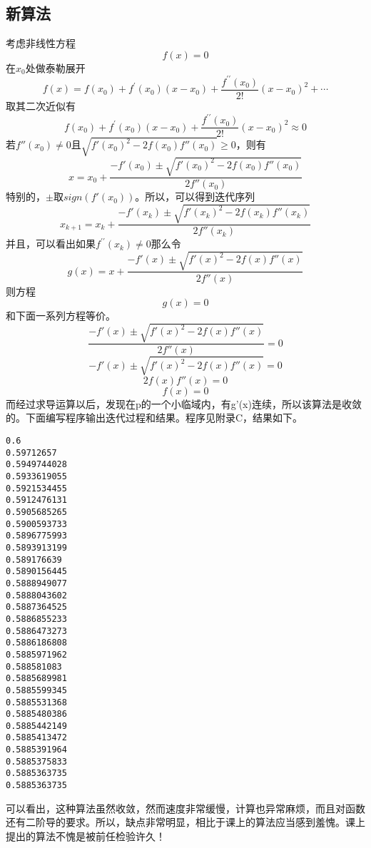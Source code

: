\documentclass[a4paper,11pt,onecolumn,twoside]{article}
\begin{document}
\subsection{新算法}
考虑非线性方程$$f(x)=0$$在$x_{0}$处做泰勒展开$$f ( x ) = f \left( x _ { 0 } \right) + f ^ { \prime } \left( x _ { 0 } \right) \left( x - x _ { 0 } \right) + \frac { f ^ { \prime \prime } \left( x _ { 0 } \right) } { 2 ! } \left( x - x _ { 0 } \right) ^ { 2 } + \cdots$$取其二次近似有
$$f \left( x _ { 0 } \right) + f ^ { \prime } \left( x _ { 0 } \right) \left( x - x _ { 0 } \right) + \frac { f ^ { \prime \prime } \left( x _ { 0 } \right) } { 2 ! } \left( x - x _ { 0 } \right) ^ { 2 }\approx 0$$
若$f''(x_{0})\neq 0$且$\sqrt{f'(x_{0})^{2}-2f(x_{0})f''(x_{0})} \geq 0$，则有
$$x=x_{0}+\frac{-f'(x_{0}) \pm \sqrt{f'(x_{0})^{2}-2f(x_{0})f''(x_{0})}}{2f''(x_{0})}$$特别的，$\pm$取$sign(f'(x_{0}))$。所以，可以得到迭代序列
$$x_{k+1}=x_{k}+\frac{-f'(x_{k}) \pm \sqrt{f'(x_{k})^{2}-2f(x_{k})f''(x_{k})}}{2f''(x_{k})}$$
并且，可以看出如果$f ^ { \prime \prime } \left( x _ { k } \right)\neq 0$那么令$$g(x)=x+\frac{-f'(x) \pm \sqrt{f'(x)^{2}-2f(x)f''(x)}}{2f''(x)}$$则方程$$g(x)=0$$和下面一系列方程等价。
$$\frac{-f'(x) \pm \sqrt{f'(x)^{2}-2f(x)f''(x)}}{2f''(x)}=0$$
$$-f'(x) \pm \sqrt{f'(x)^{2}-2f(x)f''(x)}=0$$
$$2f(x)f''(x)=0$$
$$f(x)=0$$
而经过求导运算以后，发现在p的一个小临域内，有g'(x)连续，所以该算法是收敛的。下面编写程序输出迭代过程和结果。程序见附录C，结果如下。
\begin{lstlisting}
0.6
0.59712657
0.5949744028
0.5933619055
0.5921534455
0.5912476131
0.5905685265
0.5900593733
0.5896775993
0.5893913199
0.589176639
0.5890156445
0.5888949077
0.5888043602
0.5887364525
0.5886855233
0.5886473273
0.5886186808
0.5885971962
0.588581083
0.5885689981
0.5885599345
0.5885531368
0.5885480386
0.5885442149
0.5885413472
0.5885391964
0.5885375833
0.5885363735
0.5885363735
\end{lstlisting}
可以看出，这种算法虽然收敛，然而速度非常缓慢，计算也异常麻烦，而且对函数还有二阶导的要求。所以，缺点非常明显，相比于课上的算法应当感到羞愧。课上提出的算法不愧是被前任检验许久！
\end{document}
